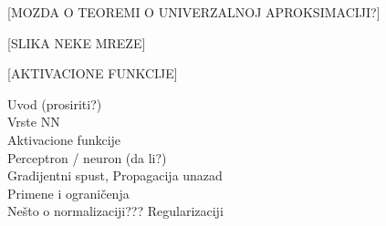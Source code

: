


[MOZDA O TEOREMI O UNIVERZALNOJ APROKSIMACIJI?]

[SLIKA NEKE MREZE]



[AKTIVACIONE FUNKCIJE]

Uvod  (prosiriti?) \\
Vrste NN \\
Aktivacione funkcije \\
Perceptron / neuron (da li?) \\
Gradijentni spust, Propagacija unazad \\
Primene i ograničenja \\
Nešto o normalizaciji??? Regularizaciji
